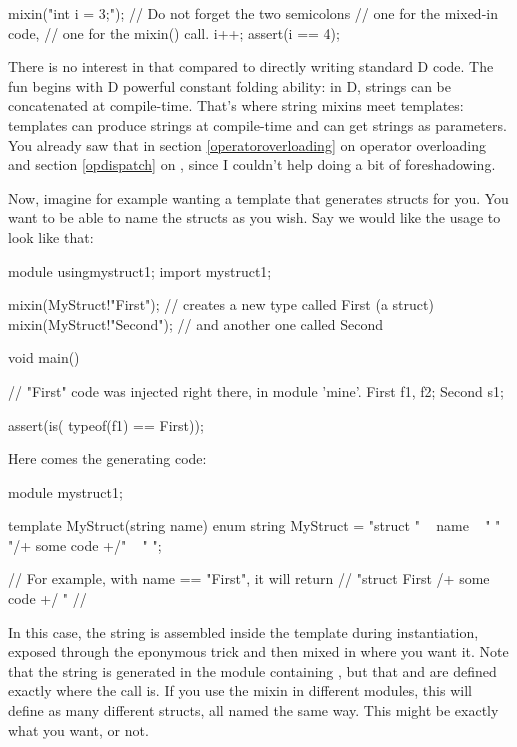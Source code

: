 \begin{dcode}
mixin("int i = 3;"); // Do not forget the two semicolons
                     // one for the mixed-in code,
                     // one for the mixin() call.
i++;
assert(i == 4);
\end{dcode}

There is no interest in that compared to directly writing standard D code. The fun begins with D powerful constant folding ability: in D, strings can be concatenated at compile-time. That's where string mixins meet templates: templates can produce strings at compile-time and can get strings as parameters. You already saw that in section \ref{operatoroverloading} on operator overloading and section \ref{opdispatch} on , since I couldn't help doing a bit of foreshadowing.

Now, imagine for example wanting a template that generates structs for you. You want to be able to name the structs as you wish. Say we would like the usage to look like that:

\begin{dcode}
module usingmystruct1;
import mystruct1;

mixin(MyStruct!"First");  // creates a new type called First (a struct)
mixin(MyStruct!"Second"); // and another one called Second

void main()
{
    // "First" code was injected right there, in module 'mine'.
    First f1, f2;
    Second s1;

    assert(is( typeof(f1) == First)); 
}
\end{dcode}

Here comes the generating code:

\begin{dcode}
module mystruct1;

template MyStruct(string name)
{
    enum string MyStruct = "struct " ~ name 
                         ~ " { "
                         ~ "/+ some code +/"
                         ~ " }";
}

// For example, with name == "First", it will return
//   "struct First { /+ some code +/ }"
//
\end{dcode}

In this case, the string is assembled inside the template during instantiation,  exposed through the eponymous trick and then mixed in where you want it. Note that the string is generated in the  module containing , but that  and  are defined exactly where the \DD{()} call is. If you use the mixin in different modules, this will define as many different structs, all named the same way. This might be exactly what you want, or not.

